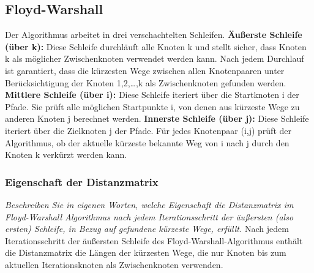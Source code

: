 \documentclass{article}
\begin{document}
\subsection{Floyd-Warshall} 
\begin{algo}[title=Floyd-Warshall Algorithmus]
Der Algorithmus arbeitet in drei verschachtelten Schleifen. \newline
\textbf{Äußerste Schleife (über k):} Diese Schleife durchläuft alle Knoten k und stellt sicher, dass Knoten k als möglicher Zwischenknoten verwendet werden kann. Nach jedem Durchlauf ist garantiert, dass die kürzesten Wege zwischen allen Knotenpaaren unter Berücksichtigung der Knoten 1,2,…,k als Zwischenknoten gefunden werden. \newline
\textbf{Mittlere Schleife (über i):} Diese Schleife iteriert über die Startknoten i der Pfade. Sie prüft alle möglichen Startpunkte i, von denen aus kürzeste Wege zu anderen Knoten j berechnet werden. \newline
\textbf{Innerste Schleife (über j):} Diese Schleife iteriert über die Zielknoten j der Pfade. Für jedes Knotenpaar (i,j) prüft der Algorithmus, ob der aktuelle kürzeste bekannte Weg von i nach j durch den Knoten k verkürzt werden kann.
\end{algo}

\subsubsection{Eigenschaft der Distanzmatrix \textcolor{ForestGreen}{\CheckmarkBold}} 
\textit{Beschreiben Sie in eigenen Worten, welche Eigenschaft die Distanzmatrix im Floyd-Warshall Algorithmus nach jedem Iterationsschritt der äußersten (also ersten) Schleife, in Bezug auf gefundene kürzeste Wege, erfüllt.   } \cite{hauptklausur21} \newline \newline
Nach jedem Iterationsschritt der äußersten Schleife des Floyd-Warshall-Algorithmus enthält die Distanzmatrix die Längen der kürzesten Wege, die nur Knoten bis zum aktuellen Iterationsknoten als Zwischenknoten verwenden.


\newpage
\end{document}
